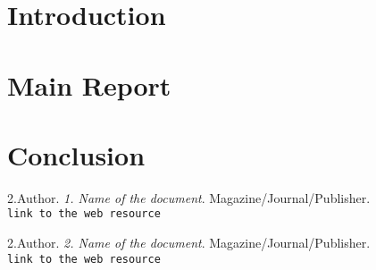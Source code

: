 \tableofcontents 
\newpage

\section{Introduction}
    \lipsum[1-1] %
\section{Main Report}
    \lipsum[2-3] %
\section{Conclusion}
    \lipsum[4-4] %

\begin{thebibliography}{}

{2.Author}. \textit{1. Name of the document}. {Magazine/Journal/Publisher}.\\
\texttt{link to the web resource}

{2.Author}. \textit{2. Name of the document}. {Magazine/Journal/Publisher}.\\
\texttt{link to the web resource}

\end{thebibliography}
